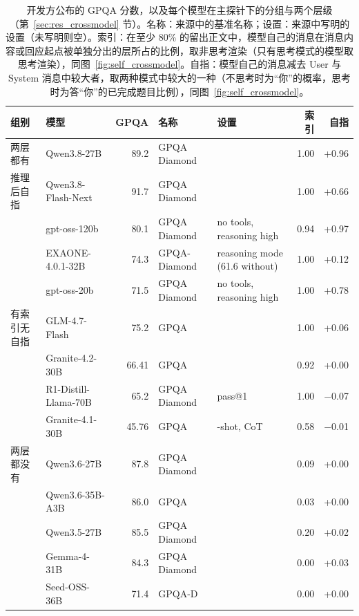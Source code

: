 \begin{table}[htbp]
\centering
\caption{开发方公布的 GPQA 分数，以及每个模型在主探针下的分组与两个层级（第~\ref{sec:res_crossmodel} 节）。名称：来源中的基准名称；设置：来源中写明的设置（未写明则空）。索引：在至少 80\% 的留出正文中，模型自己的消息在消息内容或回应起点被单独分出的层所占的比例，取非思考渲染（只有思考模式的模型取思考渲染），同图~\ref{fig:self_crossmodel}。自指：模型自己的消息减去 User 与 System 消息中较大者，取两种模式中较大的一种（不思考时为“你”的概率，思考时为答“你”的已完成题目比例），同图~\ref{fig:self_crossmodel}。}
\label{tab:self_benchmarks}
{\footnotesize
\setlength{\tabcolsep}{3.5pt}
\begin{tabular}{llrl>{\raggedright\arraybackslash}p{2.7cm}rr}
\toprule
组别 & 模型 & GPQA & 名称 & 设置 & 索引 & 自指 \\
\midrule
两层都有 & Qwen3.8-27B & 89.2 & GPQA Diamond &  & 1.00 & +0.96 \\
\midrule
推理后自指 & Qwen3.8-Flash-Next & 91.7 & GPQA Diamond &  & 1.00 & +0.66 \\
 & gpt-oss-120b & 80.1 & GPQA Diamond & no tools, reasoning high & 0.94 & +0.97 \\
 & EXAONE-4.0.1-32B & 74.3 & GPQA-Diamond & reasoning mode (61.6 without) & 1.00 & +0.12 \\
 & gpt-oss-20b & 71.5 & GPQA Diamond & no tools, reasoning high & 1.00 & +0.78 \\
\midrule
有索引无自指 & GLM-4.7-Flash & 75.2 & GPQA &  & 1.00 & +0.06 \\
 & Granite-4.2-30B & 66.41 & GPQA &  & 0.92 & +0.00 \\
 & R1-Distill-Llama-70B & 65.2 & GPQA Diamond & pass@1 & 1.00 & $-$0.07 \\
 & Granite-4.1-30B & 45.76 & GPQA & 0-shot, CoT & 0.58 & $-$0.01 \\
\midrule
两层都没有 & Qwen3.6-27B & 87.8 & GPQA Diamond &  & 0.09 & +0.00 \\
 & Qwen3.6-35B-A3B & 86.0 & GPQA &  & 0.03 & +0.00 \\
 & Qwen3.5-27B & 85.5 & GPQA Diamond &  & 0.20 & +0.02 \\
 & Gemma-4-31B & 84.3 & GPQA Diamond &  & 0.00 & +0.03 \\
 & Seed-OSS-36B & 71.4 & GPQA-D &  & 0.00 & +0.00 \\
\bottomrule
\end{tabular}}


\end{table}

